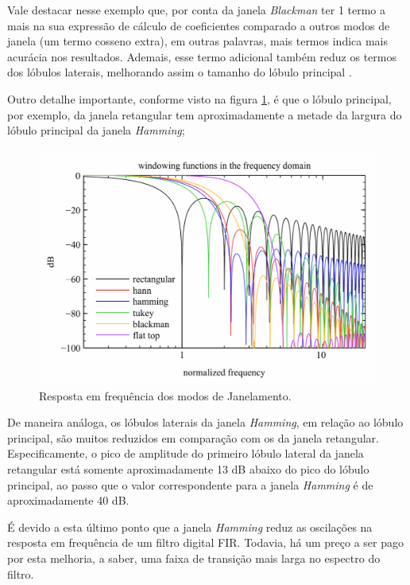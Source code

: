 		Vale destacar nesse exemplo que, por conta da janela \textit{Blackman} ter 1 termo a mais na sua expressão de cálculo de coeficientes comparado a outros modos de janela (um termo cosseno extra), em outras palavras, mais termos indica mais acurácia nos resultados. Ademais, esse termo adicional também reduz os termos dos lóbulos laterais, melhorando assim o tamanho do lóbulo principal \cite{Chakraborty2013}.
		
		Outro detalhe importante, conforme visto na figura \ref{fig-janelamento-01}, é que o lóbulo principal, por exemplo, da janela retangular tem aproximadamente a metade da largura do lóbulo principal da janela \textit{Hamming};
		
		\begin{figure}[!ht]
			\centering
			\includegraphics[scale=1]{./figuras/janelas-exemplos.png}
			\caption{Resposta em frequência dos modos de Janelamento.}
			\label{fig-janelamento-01}
		\end{figure}
		
		De maneira análoga, os lóbulos laterais da janela \textit{Hamming}, em relação ao lóbulo principal, são muitos reduzidos em comparação com os da janela retangular. Especificamente, o pico de amplitude do primeiro lóbulo lateral da janela retangular está somente aproximadamente 13 dB abaixo do pico do lóbulo principal, ao passo que o valor correspondente para a janela \textit{Hamming} é de aproximadamente 40 dB.
		
		É devido a esta último ponto que a janela \textit{Hamming} reduz as oscilações na resposta em frequência de um filtro digital FIR. Todavia, há um preço a ser pago por esta melhoria, a saber, uma faixa de transição mais larga no espectro do filtro.\cite{haykin2001sinais}
	

